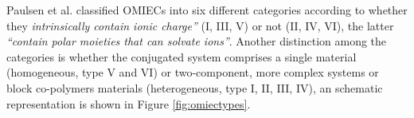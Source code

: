 Paulsen et al. classified OMIECs into six different categories according to whether they \textit{intrinsically contain ionic charge''} (I, III, V) or not (II, IV, VI), the latter \textit{``contain polar moieties that can solvate ions''}. Another distinction among the categories is whether the conjugated system comprises a single material (homogeneous, type V and VI) or two-component, more complex systems or block co-polymers materials (heterogeneous, type I, II, III, IV)\cite{paulsenOrganicMixedIonic2020}, an schematic representation is shown in Figure \ref{fig:omiectypes}. %



